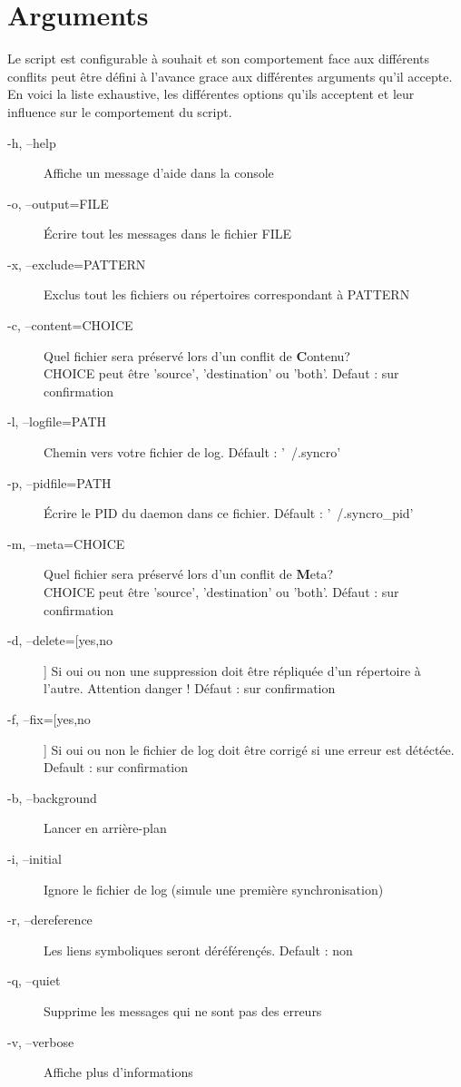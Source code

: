 \documentclass[a4paper,12pt]{report}
\begin{document}
		\section{Arguments}
			\begin{onehalfspace}
				Le script est configurable à souhait et son comportement face aux différents conflits peut être défini à l'avance grace aux différentes arguments qu'il accepte. En voici la liste exhaustive, les différentes options qu'ils acceptent et leur influence sur le comportement du script.

				\vspace{0.2cm}

				\begin{description}
					\item[-h, --help] Affiche un message d'aide dans la console
					\item[-o, --output=FILE] Écrire tout les messages dans le fichier FILE
					\item[-x, --exclude=PATTERN] Exclus tout les fichiers ou répertoires correspondant à PATTERN
					\item[-c, --content=CHOICE] Quel fichier sera préservé lors d'un conflit de \textbf{C}ontenu?\\CHOICE peut être 'source', 'destination' ou 'both'. Defaut : sur confirmation
					\item[-l, --logfile=PATH] Chemin vers votre fichier de log. Défault : '~/.syncro'
					\item[-p, --pidfile=PATH] Écrire le PID du daemon dans ce fichier. Défault : '~/.syncro\_pid'
					\item[-m, --meta=CHOICE] Quel fichier sera préservé lors d'un conflit de \textbf{M}eta?\\CHOICE peut être 'source', 'destination' ou 'both'. Défaut : sur confirmation
					\item[-d, --delete=[yes,no]] Si oui ou non une suppression doit être répliquée d'un répertoire à l'autre. Attention danger ! Défaut : sur confirmation
					\item[-f, --fix=[yes,no]] Si oui ou non le fichier de log doit être corrigé si une erreur est détéctée. Default : sur confirmation
					\item[-b, --background] Lancer en arrière-plan
					\item[-i, --initial] Ignore le fichier de log (simule une première synchronisation)
					\item[-r, --dereference] Les liens symboliques seront déréférençés. Default : non
					\item[-q, --quiet] Supprime les messages qui ne sont pas des erreurs
					\item[-v, --verbose] Affiche plus d'informations
				\end{description}
			\end{onehalfspace}
			\clearpage
\end{document}
